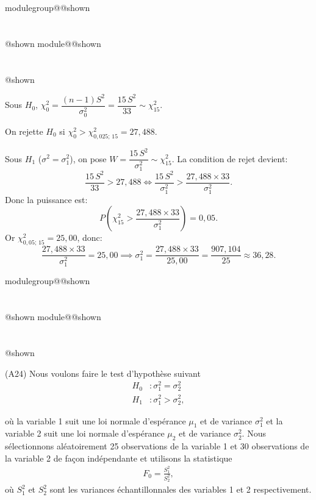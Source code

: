 \documentclass{Evaluation}
\makeatletter
\newcommand{\currentmodulekey}{}
\newcommand{\currentmoduletitle}{}
\newcommand{\currentgroupkey}{}
\newcommand{\currentgrouptitle}{}
\newcommand{\showmoduleifneeded}{%
  \ifx\currentgroupkey\empty\else
    \expandafter\ifx\csname modulegroup@\currentgroupkey @shown\endcsname\relax
      \section*{\currentgrouptitle}%
      \expandafter\gdef\csname modulegroup@\currentgroupkey @shown\endcsname{1}%
    \fi
  \fi
  \expandafter\ifx\csname module@\currentmodulekey @shown\endcsname\relax
    \section*{\currentmoduletitle}%
    \expandafter\gdef\csname module@\currentmodulekey @shown\endcsname{1}%
  \fi
}
\newenvironment{A24}{\showmoduleifneeded}{}
\makeatother
\begin{document}
\begin{questions}
\begin{A24}
\begin{solution}
Sous $H_0$, $\chi_0^2 = \dfrac{(n-1)S^2}{\sigma_0^2} = \dfrac{15\,S^2}{33} \sim \chi^2_{15}$.

On rejette $H_0$ si $\chi_0^2 > \chi^2_{0{,}025;\,15} = 27{,}488$.

Sous $H_1$ ($\sigma^2 = \sigma_1^2$), on pose $W = \dfrac{15\,S^2}{\sigma_1^2} \sim \chi^2_{15}$. La condition de rejet devient:
\[
\frac{15\,S^2}{33} > 27{,}488 \iff \frac{15\,S^2}{\sigma_1^2} > \frac{27{,}488 \times 33}{\sigma_1^2}.
\]
Donc la puissance est:
\[
P\!\left(\chi^2_{15} > \frac{27{,}488 \times 33}{\sigma_1^2}\right) = 0{,}05.
\]
Or $\chi^2_{0{,}05;\,15} = 25{,}00$, donc:
\[
\frac{27{,}488 \times 33}{\sigma_1^2} = 25{,}00 \implies \sigma_1^2 = \frac{27{,}488 \times 33}{25{,}00} = \frac{907{,}104}{25} \approx 36{,}28.
\]
\end{solution}
\end{A24}

\begin{A24}
\question (A24)
Nous voulons faire le test d'hypothèse suivant 
\begin{align*}
H_0 &:\sigma_1^2 = \sigma_2^2\\
H_1 &:\sigma_1^2 > \sigma_2^2,
\end{align*}

où la variable 1 suit une loi normale d'espérance $\mu_1$ et de variance $\sigma_1^2$ et la variable 2 suit une loi normale d'espérance $\mu_2$ et de variance $\sigma_2^2$. Nous sélectionnons aléatoirement 25 observations de la variable 1 et 30 observations de la variable 2 de façon indépendante et utilisons la statistique 
\begin{align*}
    F_0=\frac{S_1^2}{S_2^2},
\end{align*}
où $S_1^2$ et $S_2^2$ sont les variances échantillonnales des variables 1 et 2 respectivement.

\end{A24}
\end{questions}
\end{document}
